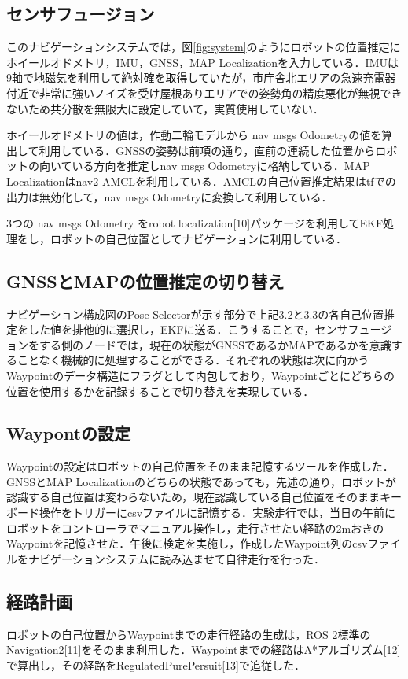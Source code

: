 \documentclass[platex,dvipdfmx]{rbproceedings}
\begin{document}
\subsection{センサフュージョン}
このナビゲーションシステムでは，図\ref{fig:system}のようにロボットの位置推定にホイールオドメトリ，IMU，GNSS，MAP Localizationを入力している．IMUは9軸で地磁気を利用して絶対確を取得していたが，市庁舎北エリアの急速充電器付近で非常に強いノイズを受け屋根ありエリアでの姿勢角の精度悪化が無視できないため共分散を無限大に設定していて，実質使用していない．

ホイールオドメトリの値は，作動二輪モデルから nav msgs Odometryの値を算出して利用している．GNSSの姿勢は前項の通り，直前の連続した位置からロボットの向いている方向を推定しnav msgs Odometryに格納している．MAP Localizationはnav2 AMCLを利用している．AMCLの自己位置推定結果はtfでの出力は無効化して，nav msgs Odometryに変換して利用している．

3つの nav msgs Odometry をrobot localization[10]パッケージを利用してEKF処理をし，ロボットの自己位置としてナビゲーションに利用している．

\subsection{GNSSとMAPの位置推定の切り替え}
ナビゲーション構成図のPose Selectorが示す部分で上記3.2と3.3の各自己位置推定をした値を排他的に選択し，EKFに送る．こうすることで，センサフュージョンをする側のノードでは，現在の状態がGNSSであるかMAPであるかを意識することなく機械的に処理することができる．それぞれの状態は次に向かうWaypointのデータ構造にフラグとして内包しており，Waypointごとにどちらの位置を使用するかを記録することで切り替えを実現している．

\subsection{Waypontの設定}
Waypointの設定はロボットの自己位置をそのまま記憶するツールを作成した．GNSSとMAP Localizationのどちらの状態であっても，先述の通り，ロボットが認識する自己位置は変わらないため，現在認識している自己位置をそのままキーボード操作をトリガーにcsvファイルに記憶する．実験走行では，当日の午前にロボットをコントローラでマニュアル操作し，走行させたい経路の2mおきのWaypointを記憶させた．午後に検定を実施し，作成したWaypoint列のcsvファイルをナビゲーションシステムに読み込ませて自律走行を行った．

\subsection{経路計画}
ロボットの自己位置からWaypointまでの走行経路の生成は，ROS 2標準のNavigation2[11]をそのまま利用した．Waypointまでの経路はA*アルゴリズム[12]で算出し，その経路をRegulatedPurePersuit[13]で追従した．
\end{document}
